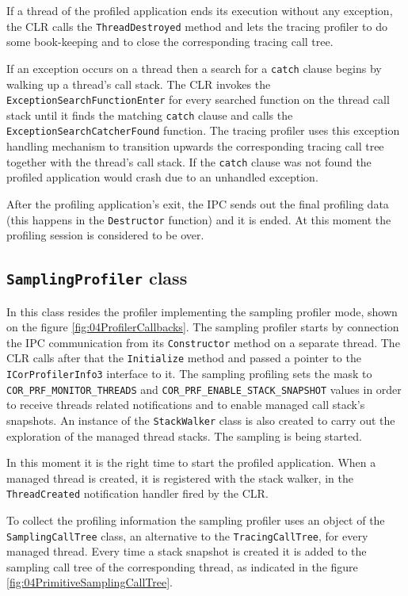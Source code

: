 If a thread of the profiled application ends its execution without any exception, the CLR calls the \texttt{ThreadDestroyed} method and lets the tracing profiler to do some book-keeping and to close the corresponding tracing call tree.

If an exception occurs on a thread then a search for a \texttt{catch} clause begins by walking up a thread's call stack. The CLR invokes the \texttt{ExceptionSearchFunctionEnter} for every searched function on the thread call stack until it finds the matching \texttt{catch} clause and calls the \texttt{ExceptionSearchCatcherFound} function. The tracing profiler uses this exception handling mechanism to transition upwards the corresponding tracing call tree together with the thread's call stack. If the \texttt{catch} clause was not found the profiled application would crash due to an unhandled exception.
 
After the profiling application's exit, the IPC sends out the final profiling data (this happens in the \texttt{Destructor} function) and it is ended. At this moment the profiling session is considered to be over.

\subsection{\texttt{SamplingProfiler} class}
In this class resides the profiler implementing the sampling profiler mode, shown on the figure \ref{fig:04ProfilerCallbacks}. The sampling profiler starts by connection the IPC communication from its \texttt{Constructor} method on a separate thread. The CLR calls after that the \texttt{Initialize} method and passed a pointer to the \texttt{ICorProfilerInfo3} interface to it. The sampling profiling sets the mask to \texttt{COR\_PRF\_MONITOR\_THREADS} and \texttt{COR\_PRF\_ENABLE\_STACK\_SNAPSHOT} values in order to receive threads related notifications and to enable managed call stack's snapshots. An instance of the \texttt{StackWalker} class is also created to carry out the exploration of the managed thread stacks. The sampling is being started.

In this moment it is the right time to start the profiled application. When a managed thread is created, it is registered with the stack walker, in the \texttt{ThreadCreated} notification handler fired by the CLR.

To collect the profiling information the sampling profiler uses an object of the \texttt{SamplingCallTree} class, an alternative to the \texttt{TracingCallTree}, for every managed thread. Every time a stack snapshot is created it is added to the sampling call tree of the corresponding thread, as indicated in the figure \ref{fig:04PrimitiveSamplingCallTree}. 

